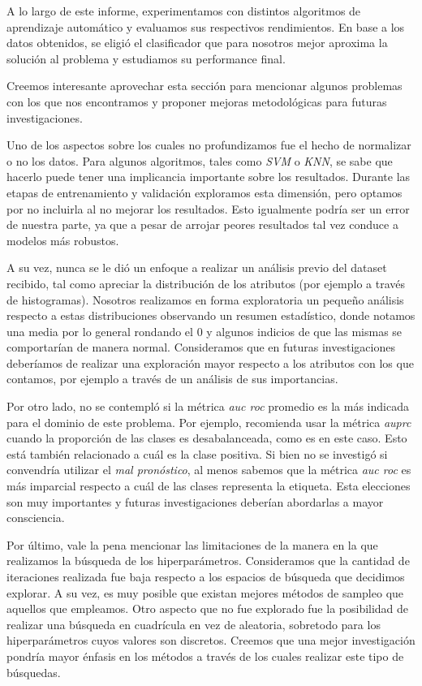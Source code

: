 A lo largo de este informe, experimentamos con distintos algoritmos de aprendizaje automático y evaluamos sus respectivos rendimientos. En base a los datos obtenidos, se eligió el clasificador que para nosotros mejor aproxima la solución al problema y estudiamos su performance final. 

Creemos interesante aprovechar esta sección para mencionar algunos problemas con los que nos encontramos y proponer mejoras metodológicas para futuras investigaciones.

Uno de los aspectos sobre los cuales no profundizamos fue el hecho de normalizar o no los datos. Para algunos algoritmos, tales como \textit{SVM} o \textit{KNN}, se sabe que hacerlo puede tener una implicancia importante sobre los resultados. Durante las etapas de entrenamiento y validación exploramos esta dimensión, pero optamos por no incluirla al no mejorar los resultados. Esto igualmente podría ser un error de nuestra parte, ya que a pesar de arrojar peores resultados tal vez conduce a modelos más robustos.

A su vez, nunca se le dió un enfoque a realizar un análisis previo del dataset recibido, tal como apreciar la distribución de los atributos (por ejemplo a través de histogramas). Nosotros realizamos en forma exploratoria un pequeño análisis respecto a estas distribuciones observando un resumen estadístico, donde notamos una media por lo general rondando el $0$ y algunos indicios de que las mismas se comportarían de manera normal. Consideramos que en futuras investigaciones deberíamos de realizar una exploración mayor respecto a los atributos con los que contamos, por ejemplo a través de un análisis de sus importancias.

Por otro lado, no se contempló si la métrica \textit{auc roc} promedio es la más indicada para el dominio de este problema. Por ejemplo, \cite{Saito} recomienda usar la métrica \textit{auprc} cuando la proporción de las clases es desabalanceada, como es en este caso. Esto está también relacionado a cuál es la clase positiva. Si bien no se investigó si convendría utilizar el \textit{mal pronóstico}, al menos sabemos que la métrica \textit{auc roc} es más imparcial respecto a cuál de las clases representa la etiqueta. Esta elecciones son muy importantes y futuras investigaciones deberían abordarlas a mayor consciencia.

Por último, vale la pena mencionar las limitaciones de la manera en la que realizamos la búsqueda de los hiperparámetros. Consideramos que la cantidad de iteraciones realizada fue baja respecto a los espacios de búsqueda que decidimos explorar. A su vez, es muy posible que existan mejores métodos de sampleo que aquellos que empleamos. Otro aspecto que no fue explorado fue la posibilidad de realizar una búsqueda en cuadrícula en vez de aleatoria, sobretodo para los hiperparámetros cuyos valores son discretos. Creemos que una mejor investigación pondría mayor énfasis en los métodos a través de los cuales realizar este tipo de búsquedas.